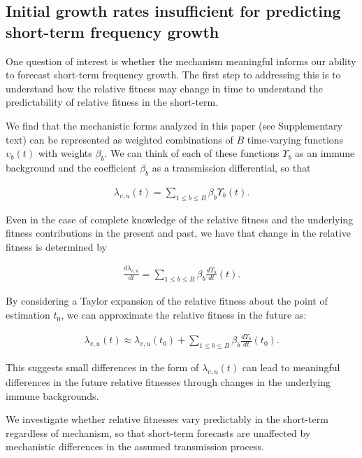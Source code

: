 \documentclass[11pt,oneside,letterpaper]{article}
\begin{document}
\subsection*{Initial growth rates insufficient for predicting short-term frequency growth}

One question of interest is whether the mechanism meaningful informs our ability to forecast short-term frequency growth.
The first step to addressing this is to understand how the relative fitness may change in time to understand the predictability of relative fitness in the short-term.

We find that the mechanistic forms analyzed in this paper (see Supplementary text) can be represented as weighted combinations of $B$ time-varying functions $\upsilon_{b}(t)$ with weights $\beta_{b}$.
We can think of each of these functions $\Upsilon_b$ as an immune background and the coefficient $\beta_{b}$ as a transmission differential, so that

\begin{align*}
\lambda_{v,u}(t) = \sum_{1 \leq b \leq B} \beta_{b} \Upsilon_{b}(t).
\end{align*}

Even in the case of complete knowledge of the relative fitness and the underlying fitness contributions in the present and past, we have that change in the relative fitness is determined by

\begin{align*}
    \frac{d\lambda_{v,u}}{dt} = \sum_{1 \leq b \leq B} \beta_{b} \frac{d\Upsilon_{b}}{dt}(t).
\end{align*}

By considering a Taylor expansion of the relative fitness about the point of estimation $t_{0}$, we can approximate the relative fitness in the future as:

\begin{align*}
    \lambda_{v,u}(t) \approx \lambda_{v,u}(t_{0}) + \sum_{1\leq b \leq B} \beta_b \frac{d\Upsilon_b}{dt}(t_0).
\end{align*}

This suggests small differences in the form of $\lambda_{v,u}(t)$ can lead to meaningful differences in the future relative fitnesses through changes in the underlying immune backgrounds.

We investigate whether relative fitnesses vary predictably in the short-term regardless of mechanism, so that short-term forecasts are unaffected by mechanistic differences in the assumed transmission process.
\end{document}
